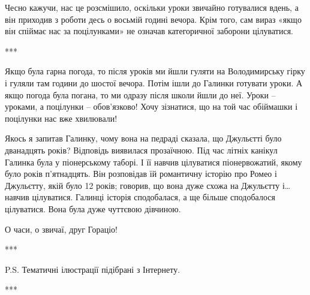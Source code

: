 Чесно кажучи, нас це розсмішило, оскільки уроки звичайно готувалися вдень, а
він приходив з роботи десь о восьмій годині вечора. Крім того, сам вираз «якщо
він спіймає нас за поцілунками» не означав категоричної заборони цілуватися.

***

Якщо була гарна погода, то після уроків ми йшли гуляти на Володимирську гірку і
гуляли там години до шостої вечора. Потім ішли до Галинки готувати уроки. А
якщо погода була погана, то ми одразу після школи йшли до неї. Уроки – уроками,
а поцілунки – обов’язково! Хочу зізнатися, що на той час обіймашки і поцілунки
нас вже хвилювали!  

Якось я запитав Галинку, чому вона на педраді сказала, що Джульєтті було
дванадцять років? Відповідь виявилася прозаїчною. Під час літніх канікул
Галинка була у піонерському таборі. І її навчив цілуватися піонервожатий, якому
було років п’ятнадцять. Він розповідав їй романтичну історію про Ромео і
Джульєтту, якій було 12 років; говорив, що вона дуже схожа на Джульєтту і…
навчив цілуватися. Галинці історія сподобалася, а ще більше сподобалося
цілуватися. Вона була дуже чуттєвою дівчиною.

О часи, о звичаї, друг Гораціо!

***

P.S. Тематичні ілюстрації підібрані з Інтернету.

***

